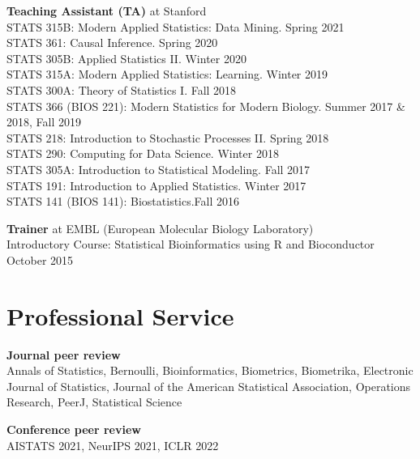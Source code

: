 \documentclass[margin,line]{res}
\newcommand{\ver}{\vspace*{-2.7mm}}
\begin{document}
\begin{resume}
\ver
\textbf{Teaching Assistant (TA)} at Stanford\\
STATS 315B: Modern Applied Statistics: Data Mining. \hfill Spring 2021\\ 
STATS 361: Causal Inference. \hfill Spring 2020\\
STATS 305B: Applied Statistics II. \hfill Winter 2020\\
STATS 315A: Modern Applied Statistics: Learning. \hfill Winter 2019\\
STATS 300A: Theory of Statistics I. \hfill Fall 2018\\
STATS 366 (BIOS 221): Modern Statistics for Modern Biology. \hfill Summer 2017 \& 2018, Fall 2019\\
STATS 218: Introduction to Stochastic Processes II. \hfill Spring 2018\\
STATS 290: Computing for Data Science. \hfill Winter 2018\\
STATS 305A: Introduction to Statistical Modeling. \hfill Fall 2017\\
STATS 191: Introduction to Applied Statistics. \hfill Winter 2017\\
STATS 141 (BIOS 141): Biostatistics.\hfill Fall 2016

\ver
\textbf{Trainer} at EMBL (European Molecular Biology Laboratory)\\
Introductory Course: Statistical Bioinformatics using R and Bioconductor \hfill October 2015




\section{\sc Professional Service}

\textbf{Journal peer review}\\
Annals of Statistics, Bernoulli, Bioinformatics, Biometrics, Biometrika, Electronic Journal of Statistics, Journal of the American Statistical Association, Operations Research, PeerJ, Statistical Science

\ver
\textbf{Conference peer review}\\
AISTATS 2021, NeurIPS 2021, ICLR 2022








\end{resume}
\end{document}
